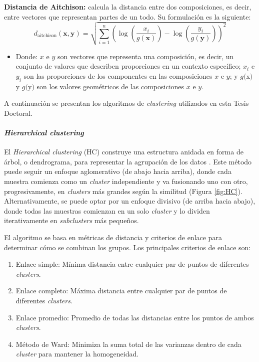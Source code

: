 \textbf{Distancia de Aitchison:} calcula la distancia entre dos composiciones, es decir, entre vectores que representan partes de un todo. Su formulación es la siguiente:
\begin{equation}
d_{\text{aitchison}}(\mathbf{x}, \mathbf{y}) = \sqrt{\sum_{i=1}^{n} \left( \log\left(\frac{x_i}{g(\mathbf{x})}\right) - \log\left(\frac{y_i}{g(\mathbf{y})}\right) \right)^2}
\end{equation}
\begin{itemize}
\item Donde: $x$ e $y$ son vectores que representa una composición, es decir, un conjunto de valores que describen proporciones en un contexto específico;  $x_i$ e $y_i$ son las proporciones de los componentes en las composiciones $x$ e $y$; y $g($x$)$ y $g($y$)$  son los valores geométricos de las composiciones $x$ e $y$.
\end{itemize}

A continuación se presentan los algoritmos de \textit{clustering} utilizados en esta Tesis Doctoral.

\paragraph{\textit{Hierarchical clustering}}

El \textit{Hierarchical clustering} (HC) construye una estructura anidada en forma de árbol, o dendrograma, para representar la agrupación de los datos \cite{johnson1967hierarchical}. Este método puede seguir un enfoque aglomerativo (de abajo hacia arriba), donde cada muestra comienza como un \textit{cluster} independiente y va fusionando uno con otro, progresivamente, en \textit{clusters} más grandes según la similitud (Figura \ref{fig:HC}). Alternativamente, se puede optar por un enfoque divisivo (de arriba hacia abajo), donde todas las muestras comienzan en un solo \textit{cluster} y lo dividen iterativamente en \textit{subclusters} más pequeños. 

El algoritmo se basa en métricas de distancia y criterios de enlace para determinar cómo se combinan los grupos. Los principales criterios de enlace son:
\begin{enumerate}
\item Enlace simple: Mínima distancia entre cualquier par de puntos de diferentes \textit{clusters}.

\item Enlace completo: Máxima distancia entre cualquier par de puntos de diferentes \textit{clusters}.

\item Enlace promedio: Promedio de todas las distancias entre los puntos de ambos \textit{clusters}.

\item Método de Ward: Minimiza la suma total de las varianzas dentro de cada \textit{cluster} para mantener la homogeneidad.
\end{enumerate}

